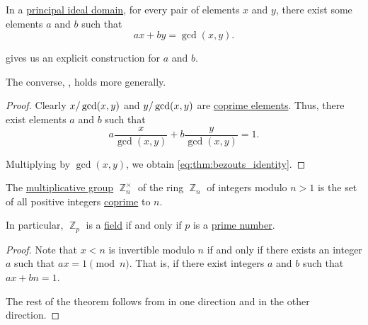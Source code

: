 \begin{theorem}\label{thm:bezouts_identity}
  In a \hyperref[def:principal_ideal_domain]{principal ideal domain}, for every pair of elements \( x \) and \( y \), there exist some elements \( a \) and \( b \) such that
  \begin{equation}\label{eq:thm:bezouts_identity}
    ax + by = \gcd(x, y).
  \end{equation}

   gives us an explicit construction for \( a \) and \( b \).

  The converse, , holds more generally.
\end{theorem}
\begin{proof}
  Clearly \( \ifrac x {\gcd(x, y)} \) and \( \ifrac y {\gcd(x, y)} \) are \hyperref[def:coprime_elements]{coprime elements}. Thus, there exist elements \( a \) and \( b \) such that
  \begin{equation*}
    a \frac x {\gcd(x, y)} + b \frac y {\gcd(x, y)} = 1.
  \end{equation*}

  Multiplying by \( \gcd(x, y) \), we obtain \eqref{eq:thm:bezouts_identity}.
\end{proof}

\begin{corollary}\label{thm:multiplicative_group_of_integers_modulo}
  The \hyperref[def:semiring]{multiplicative group} \( \BbbZ_n^\times \) of the ring \hyperref[thm:ring_of_integers_modulo]{\( \BbbZ_n \)} of integers modulo \( n > 1 \) is the set of all positive integers \hyperref[def:coprime_elements]{coprime} to \( n \).

  In particular, \( \BbbZ_p \) is a \hyperref[def:field]{field} if and only if \( p \) is a \hyperref[def:prime_number]{prime number}.
\end{corollary}
\begin{proof}
  Note that \( x < n \) is invertible modulo \( n \) if and only if there exists an integer \( a \) such that \( ax = 1 \pmod n \). That is, if there exist integers \( a \) and \( b \) such that \( ax + bn = 1 \).

  The rest of the theorem follows from  in one direction and  in the other direction.
\end{proof}

